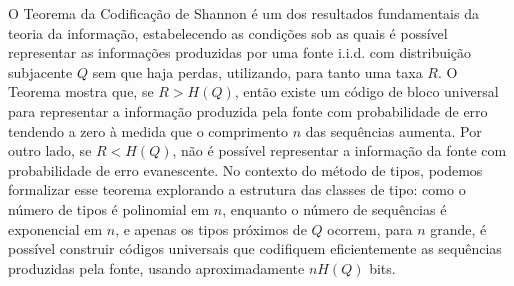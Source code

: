 O Teorema da Codificação de Shannon é um dos resultados fundamentais da teoria
da informação, estabelecendo as condições sob as quais é possível representar
as informações produzidas por uma fonte i.i.d. com distribuição subjacente $Q$
sem que haja perdas, utilizando, para tanto uma taxa $R$.
O Teorema mostra que, se $R > H(Q)$, então existe um código de bloco universal
para representar a informação produzida pela fonte com probabilidade de erro
tendendo a zero à medida que o comprimento $n$ das sequências aumenta.
Por outro lado, se $R < H(Q)$, não é possível representar a informação da fonte
com probabilidade de erro evanescente.
No contexto do método de tipos, podemos formalizar esse teorema explorando a
estrutura das classes de tipo: como o número de tipos é polinomial em $n$,
enquanto o número de sequências é exponencial em $n$, e apenas os tipos próximos
de $Q$ ocorrem, para $n$ grande, é possível construir códigos universais que
codifiquem eficientemente as sequências produzidas pela fonte, usando aproximadamente 
$nH(Q)$ bits.

